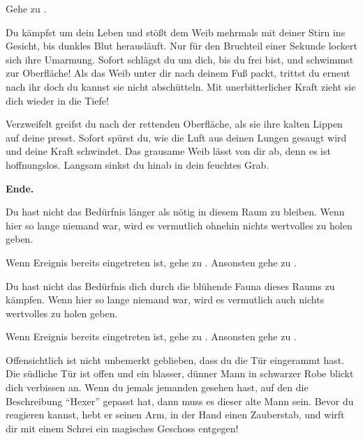 Gehe zu .


Du kämpfst um dein Leben und stößt dem Weib mehrmals mit deiner Stirn ins Gesicht, bis dunkles Blut herausläuft. Nur für den Bruchteil einer Sekunde lockert sich ihre Umarmung. Sofort schlägst du um dich, bis du frei bist, und schwimmst zur Oberfläche! Als das Weib unter dir nach deinem Fuß packt, trittst du erneut nach ihr doch du kannst sie nicht abschütteln. Mit unerbitterlicher Kraft zieht sie dich wieder in die Tiefe!

Verzweifelt greifst du nach der rettenden Oberfläche, als sie ihre kalten Lippen auf deine presst. Sofort spürst du, wie die Luft aus deinen Lungen gesaugt wird und deine Kraft schwindet.
Das grausame Weib lässt von dir ab, denn es ist hoffnungslos.
Langsam sinkst du hinab in dein feuchtes Grab.

\textbf{Ende.}


Du hast nicht das Bedürfnis länger als nötig in diesem Raum zu bleiben. Wenn hier so lange niemand war, wird es vermutlich ohnehin nichts wertvolles zu holen geben.

Wenn Ereignis  bereits eingetreten ist, gehe zu .
Ansonsten gehe zu .


Du hast nicht das Bedürfnis dich durch die blühende Fauna dieses Raums zu kämpfen. Wenn hier so lange niemand war, wird es vermutlich auch nichts wertvolles zu holen geben.

Wenn Ereignis  bereits eingetreten ist, gehe zu .
Ansonsten gehe zu .


Offensichtlich ist nicht unbemerkt geblieben, dass du die Tür eingerammt hast. Die südliche Tür ist offen und ein blasser, dünner Mann in schwarzer Robe blickt dich verbissen an. Wenn du jemals jemanden gesehen hast, auf den die Beschreibung ``Hexer'' gepasst hat, dann muss es dieser alte Mann sein. Bevor du reagieren kannst, hebt er seinen Arm, in der Hand einen Zauberstab, und wirft dir mit einem Schrei ein magisches Geschoss entgegen!

